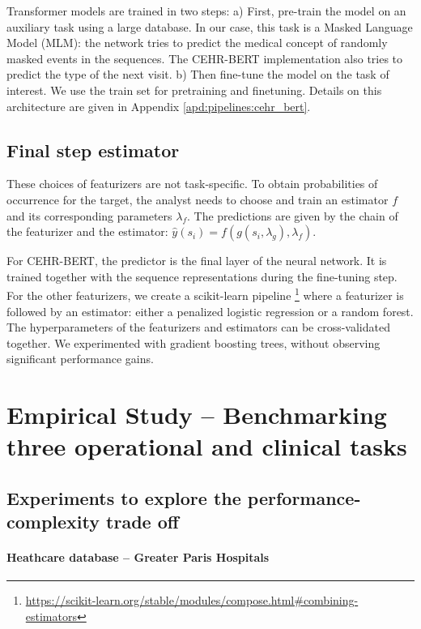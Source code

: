 \documentclass[french,12pt,twoside,a4paper]{book}
\begin{document}
Transformer models are trained in two steps: a) First, pre-train the model on an
auxiliary task using a large database. In our case, this task is a Masked Language
Model (MLM): the network tries to predict the medical concept of randomly masked
events in the sequences. The CEHR-BERT implementation also tries to predict the
type of the next visit. b) Then fine-tune the model on the task of interest. We
use the train set for pretraining and finetuning. Details on this
architecture are given in Appendix \ref{apd:pipelines:cehr_bert}.

\subsection{Final step estimator}\label{subsec:predictive_models:estimators}

These choices of featurizers are not task-specific. To obtain probabilities of
occurrence for the target, the analyst needs to choose and train an estimator $f$
and its corresponding parameters $\lambda_f$. The predictions are given by the chain of the featurizer and the
estimator: $\hat{y}(s_i) = f(g(s_i, \lambda_g), \lambda_f)$.

For CEHR-BERT, the predictor is the final layer of the neural network. It is
trained together with the sequence representations during the fine-tuning step.
For the other featurizers, we create a scikit-learn pipeline
\footnote{\url{https://scikit-learn.org/stable/modules/compose.html\#combining-estimators}}
where a featurizer is followed by an estimator: either a penalized logistic
regression or a random forest. The hyperparameters of the featurizers and
estimators can be cross-validated together. %
We experimented with gradient boosting trees, without observing significant performance gains.


\section{Empirical Study -- Benchmarking three operational and clinical
  tasks}\label{sec:predictive_models:empirical_study}

\subsection{Experiments to explore the performance-complexity trade off}%
\label{subsec:predictive_models:expe_definitions}%

\paragraph{Heathcare database -- Greater Paris Hospitals}%
\label{sec:data_extraction}%
\end{document}
